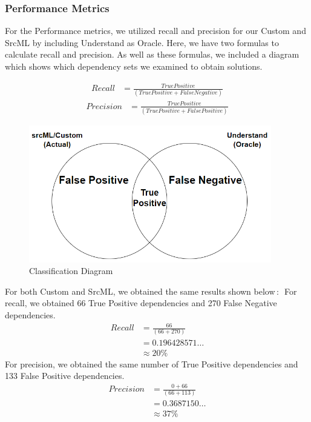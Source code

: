\documentclass[12pt, dvipsnames, a4paper]{article}
\begin{document}
		\subsubsection{Performance Metrics}
		For the Performance metrics, we utilized recall and precision for our Custom and SrcML by including Understand as Oracle.
		Here, we have two formulas to calculate recall and precision. As well as these formulas, we included a diagram which shows which dependency sets we examined to obtain solutions.

		\begin{equation*}
			\begin{split}
				Recall &= \frac{True Positive}{(True Positive + False Negative)}
			\end{split}
		\end{equation*}
		\newline
		\begin{equation*}
			\begin{split}
				Precision &= \frac{True Positive}{(True Positive + False Positive)}
			\end{split}
		\end{equation*}

		\begin{figure}[h]
			\center
			\includegraphics[width=300pt]{assets/recall_precision_diagram.PNG}
			\caption{Classification Diagram}
		\end{figure}

		For both Custom and SrcML, we obtained the same results shown below$\,\colon\,$
\newline
For recall, we obtained 66 True Positive dependencies and 270 False Negative dependencies.
\begin{equation*}
	\begin{split}
		Recall &= \frac{66}{(66 + 270)}\\
		&= 0.196428571\dots\\
		&\approx 20\%
	\end{split}
\end{equation*}
For precision, we obtained the same number of True Positive dependencies and 133 False Positive dependencies.
\begin{equation*}
	\begin{split}
		Precision &= \frac{0 + 66}{(66 + 113)}\\
		&= 0.3687150\dots\\
		&\approx 37\%
	\end{split}
\end{equation*}
\clearpage
\end{document}
